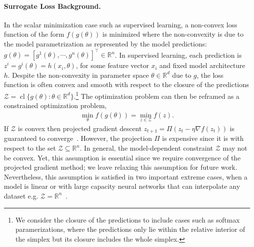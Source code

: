 \documentclass{article} %
\theoremstyle{definition}
\newcommand{\reals}{\mathbb{R}}
\newcommand*\closure[1]{\operatorname{cl}#1}
\begin{document}
 \paragraph{Surrogate Loss Background.} In the scalar minimization case such as supervised learning, a non-convex loss function of the form $f(g(\theta))$ is minimized where the non-convexity is due to the model parametrization as represented by the model predictions: $g(\theta)= \left[g^1(\theta), \cdots, g^n(\theta)\right]^\top \in \reals^n$.  In supervised learning, each prediction is $z^i = g^i(\theta) = h(x_i, \theta)$, for some feature vector $x_i$ and fixed model architecture $h$.
Despite the non-convexity in parameter space $\theta \in \reals^d$ due to $g$, the loss function is often convex and smooth with respect to the closure of the predictions $\mathcal{Z} = \closure{\{g(\theta) : \theta \in \reals^d\}}$.\footnote{We consider the closure of the predictions to include cases such as softmax paramerizations, where the predictions only lie within the relative interior of the simplex but its closure includes the whole simplex.}
The optimization problem can then be reframed as a constrained optimization problem,
\begin{align}\label{eq:scalar-min}
       \min_\theta f(g(\theta)) = \underset{z\in\mathcal{Z}}{\min} f(z).
\end{align}
If $\mathcal{Z}$ is convex then projected gradient descent $z_{t+1} = \Pi(z_t - \eta \nabla f(z_t))$ is guaranteed to converge~\citep{beck2017first}.
However, the projection $\Pi$ is expensive since it is with respect to the set $\mathcal{Z} \subseteq \reals^n$.
In general, the model-dependent constraint $\mathcal{Z}$ may not be convex. Yet, this assumption is essential since we require convergence of the projected gradient method; we leave relaxing this assumption for future work.  
Nevertheless, this assumption is satisfied in two important extreme cases, when a model is linear or with large capacity neural networks that can interpolate any dataset e.g. $\mathcal{Z}= \reals^n$~\citep{zhang2017understanding}.
\end{document}
